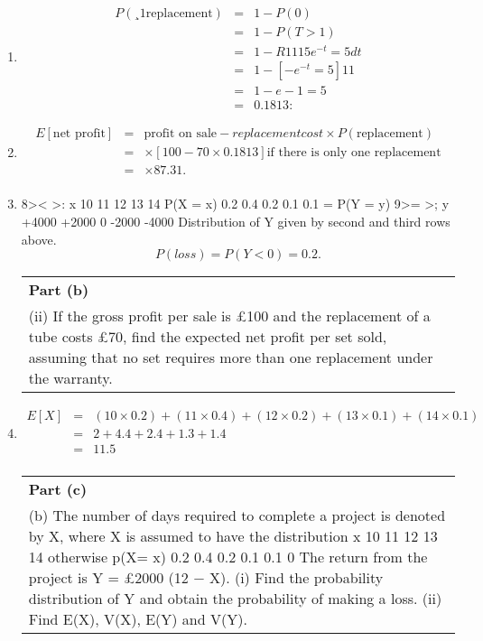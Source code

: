 \documentclass[a4paper,12pt]{article}
\begin{document}
    
\begin{enumerate}
\item 
\begin{eqnarray*}
P(¸1 \mbox{replacement})&=&1-P(0)
\\&=&1-P(T>1)
\\&=&1-
R1
1
1
5 e^{-t}=5dt
\\&=&1 - [-e^{-t}=5]1
1 
\\&=&1 - e-1=5 \\&=& 0.1813:
\end{eqnarray*}
\item
\begin{eqnarray*}
E[\mbox{net profit}]
&=& \mbox{profit on sale} - replacement cost \times  P(\mbox{replacement})\\
&=& \times [100-70\times 0.1813] \mbox{if there is only one replacement}\\
&=& \times 87.31 .\\
\end{eqnarray*}
\item 
8><
>:
x 10 11 12 13 14
P(X = x) 0.2 0.4 0.2 0.1 0.1 = P(Y = y)
9>=
>;
y +4000 +2000 0 -2000 -4000
Distribution of Y given by second and third rows above.
\[P(loss)=P(Y<0)=0.2 .\]

\begin{table}[ht!]
     \centering
     \begin{tabular}{|p{15cm}|}
     \hline        
 \noindent \textbf{Part (b)}\\
\noindent (ii) If the gross profit per sale is £100 and the replacement of a tube costs £70, find the expected net profit per set sold, assuming that no set requires more than  one replacement under the warranty.
\\ \hline
 \end{tabular}
\end{table}
\item 
\begin{eqnarray*}
E[X]&=&(10\times 0.2)+(11\times 0.4)+(12\times 0.2)+(13\times 0.1)+(14\times 0.1)\\
&=& 2 + 4.4 + 2.4 + 1.3+ 1.4\\
&=&11.5\\
\end{eqnarray*}
 \begin{tabular}{|p{15cm}|}
     \hline        
 \noindent \textbf{Part (c)}\\
\noindent 
(b) The number of days required to complete a project is denoted by X, where X is assumed to have the distribution
x 10 11 12 13 14 otherwise p(X= x) 0.2 0.4 0.2 0.1 0.1 0
The return from the project is Y = £2000 (12 − X).
(i) Find the probability distribution of Y and obtain the probability of making a loss.
(ii) Find E(X), V(X), E(Y) and V(Y).


\end{tabular}
\end{enumerate}
\end{document}
